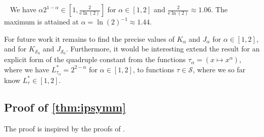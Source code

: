 \documentclass{article}
\newcommand*{\mc}[1]{\mathcal{#1}}
\newcommand{\euler}{\mathrm{e}}
\newcommand{\tran}{\tau}
\newcommand{\ctransymbol}{L}
\newcommand{\ctranobest}[1]{\ctransymbol_{#1}^{*}}
\newcommand{\ctranbest}{\ctranobest{\tran}}
\newcommand{\setcc}{\mc S}
\newcommand{\setcco}{\mc S_0}
\begin{document}
%
\begin{remark}\mbox{ }
	We have $\alpha 2^{1-\alpha} \in [1 , \frac{2}{\euler\ln(2)}]$ for $\alpha\in[1,2]	$ and $\frac{2}{\euler\ln(2)} \approx 1.06$. The maximum is attained at $\alpha = \ln(2)^{-1}\approx 1.44$.
\end{remark} 
%
For future work it remains to find the precise values of $K_\alpha$ and $J_\alpha$ for $\alpha\in[1,2]$, and for $K_{\setcco}$ and $J_{\setcco}$.
Furthermore, it would be interesting extend the result for an explicit form of the quadruple constant from the functions $\tran_\alpha = (x\mapsto x^\alpha)$, where we have $\ctranobest{\tran_\alpha} = 2^{2-\alpha}$ for $\alpha\in[1,2]$, to functions $\tran\in\setcc$, where we so far know $\ctranbest\in[1,2]$.
%
\begin{appendix}
\section{Proof of \cref{thm:ipsymm}}\label{app:proofsymm}
%
The proof is inspired by the proofs of \cite[Proposition 4.1.1, Proposition 4.1.2]{enflo70}.


\end{appendix}
\end{document}
